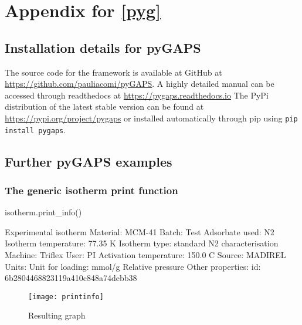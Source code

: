 
\graphicspath{ {\thisch/figures/} }

\chapter{Appendix for \autoref{pyg}}%
\label{appx:pyg}


\section{Installation details for pyGAPS}

The source code for the framework is available at GitHub
at \url{https://github.com/pauliacomi/pyGAPS}. A highly detailed 
manual can be accessed through readthedocs
at \url{https://pygaps.readthedocs.io}
The PyPi distribution of the latest stable version can be found at
\url{https://pypi.org/project/pygaps}
or installed automatically through pip using \lstinline{pip install pygaps}.

\section{Further pyGAPS examples}\label{appx:pyg:examples}

\subsection{The generic isotherm print function}

\begin{python}[caption={Generic info function},label={appx:lst:print_info}]
isotherm.print_info()
\end{python}
\begin{pythonout}
Experimental isotherm
Material:               MCM-41
Batch:                  Test
Adsorbate used:         N2
Isotherm temperature:   77.35 K
Isotherm type:          standard N2 characterisation
Machine:                Triflex
User:                   PI
Activation temperature: 150.0 C
Source:                 MADIREL
Units: 
    Unit for loading:   mmol/g
    Relative pressure
Other properties:
    id: 6b2804468823119a410c848a74debb38
\end{pythonout}
\begin{figure}[H]
    \centering
    \texttt{[image: printinfo]}
    \caption{Resulting graph}\label{appx:pyg:print_info}
\end{figure}

